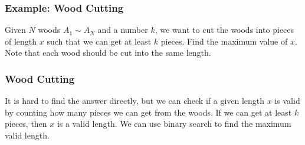 \documentclass[xcolor=dvipsnames]{beamer}
\begin{document}
    \begin{frame}
        \frametitle{Example: Wood Cutting}
        Given $N$ woods $A_1\sim A_N$ and a number $k$, we want to cut the woods into pieces of length $x$ such that we can get at least $k$ pieces. Find the maximum value of $x$. Note that each wood should be cut into the same length.\\
    \end{frame}

    \begin{frame}
        \frametitle{Wood Cutting}
        It is hard to find the answer directly, but we can check if a given length $x$ is valid by counting how many pieces we can get from the woods. If we can get at least $k$ pieces, then $x$ is a valid length. We can use binary search to find the maximum valid length.\\
    \end{frame}


    
\end{document}
